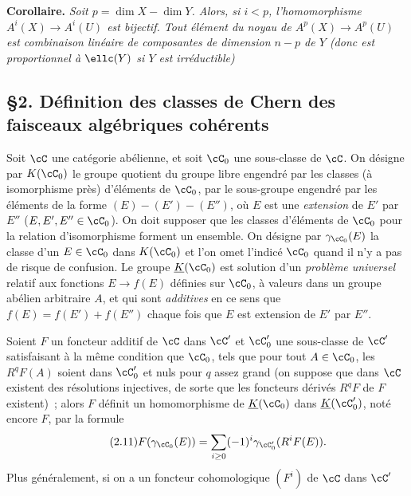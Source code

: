 \textbf{Corollaire.} \emph{Soit $p=\dim X-\dim Y$. Alors, si $i<p$, l'homomorphisme $A^i(X)\longrightarrow A^i(U)$ est bijectif. Tout élément du noyau de $A^p(X)\longrightarrow A^p(U)$ est combinaison linéaire de composantes de dimension $n-p$ de $Y$ (donc est proportionnel à $\ellc(Y)$ si $Y$ est irréductible)}

\subsection*{\S 2. Définition des classes de Chern des faisceaux algébriques cohérents}

Soit $\cC$ une catégorie abélienne, et soit $\cC_0$ une sous-classe de $\cC$. On désigne par $K(\cC_0)$ le groupe quotient du groupe libre engendré par les classes (à isomorphisme près) d'éléments de $\cC_0$, par le sous-groupe engendré par les éléments de la forme $(E)-(E')-(E'')$, où $E$ est une \emph{extension} de $E'$ par $E''$ ($E,E',E''\in\cC_0$). On doit supposer que les classes d'éléments de $\cC_0$ pour la relation d'isomorphisme forment un ensemble. On désigne par $\gamma_{\cC_0}(E)$ la classe d'un $E\in\cC_0$ dans $K(\cC_0)$ et l'on omet l'indicé $\cC_0$ quand il n'y a pas de risque de confusion. Le groupe $\underline{K}(\cC_0)$ est solution d'un \emph{problème universel} relatif aux fonctions $E\longrightarrow f(E)$ définies sur $\cC_0$, à valeurs dans un groupe abélien arbitraire $A$, et qui sont \emph{additives} en ce sens que $f(E)=f(E')+f(E'')$ chaque fois que $E$ est extension de $E'$ par $E''$.

Soient $F$ un foncteur additif de $\cC$ dans $\cC'$ et $\cC'_0$ une sous-classe de $\cC'$ satisfaisant à la même condition que $\cC_0$, tels que pour tout $A\in\cC_0$, les $R^qF(A)$ soient dans $\cC'_0$ et nuls pour $q$ assez grand (on suppose que dans $\cC$ existent des résolutions injectives, de sorte que les foncteurs dérivés $R^qF$ de $F$ existent)~; alors $F$ définit un homomorphisme de $\underline{K}(\cC_0)$ dans $\underline{K}(\cC'_0)$, noté encore $F$, par la formule
\begin{equation}\tag{2.11}
 F(\gamma_{\cC_0}(E))=\sum_{i\geq 0}(-1)^i\gamma_{\cC'_0}(R^iF(E)).
\end{equation}
Plus généralement, si on a un foncteur cohomologique $(F^i)$ de $\cC$ dans $\cC'$ 
